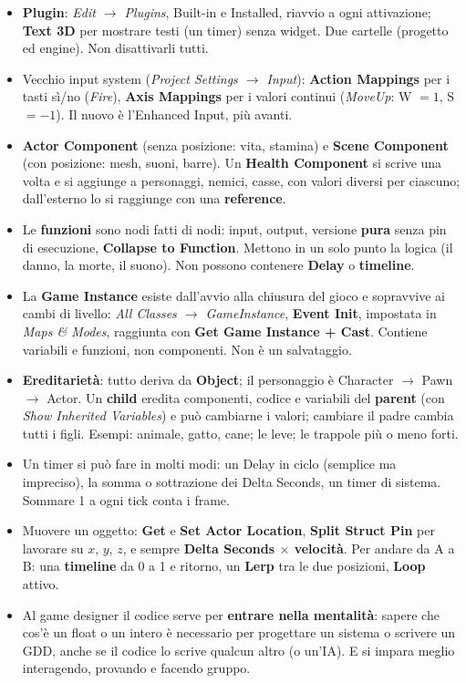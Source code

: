 \begin{itemize}
        versione vecchia. I branch sperimentali si possono abbandonare.
  \item \textbf{Plugin}: \emph{Edit $\rightarrow$ Plugins}, Built-in e
        Installed, riavvio a ogni attivazione; \textbf{Text 3D} per mostrare
        testi (un timer) senza widget. Due cartelle (progetto ed engine). Non
        disattivarli tutti.
  \item Vecchio input system (\emph{Project Settings $\rightarrow$ Input}):
        \textbf{Action Mappings} per i tasti sì/no (\emph{Fire}),
        \textbf{Axis Mappings} per i valori continui (\emph{MoveUp}: W $= 1$,
        S $= -1$). Il nuovo è l'Enhanced Input, più avanti.
  \item \textbf{Actor Component} (senza posizione: vita, stamina) e
        \textbf{Scene Component} (con posizione: mesh, suoni, barre). Un
        \textbf{Health Component} si scrive una volta e si aggiunge a
        personaggi, nemici, casse, con valori diversi per ciascuno; dall'esterno
        lo si raggiunge con una \textbf{reference}.
  \item Le \textbf{funzioni} sono nodi fatti di nodi: input, output, versione
        \textbf{pura} senza pin di esecuzione, \textbf{Collapse to Function}.
        Mettono in un solo punto la logica (il danno, la morte, il suono). Non
        possono contenere \textbf{Delay} o \textbf{timeline}.
  \item La \textbf{Game Instance} esiste dall'avvio alla chiusura del gioco e
        sopravvive ai cambi di livello: \emph{All Classes $\rightarrow$
        GameInstance}, \textbf{Event Init}, impostata in \emph{Maps \& Modes},
        raggiunta con \textbf{Get Game Instance + Cast}. Contiene variabili e
        funzioni, non componenti. Non è un salvataggio.
  \item \textbf{Ereditarietà}: tutto deriva da \textbf{Object}; il personaggio
        è Character $\rightarrow$ Pawn $\rightarrow$ Actor. Un \textbf{child}
        eredita componenti, codice e variabili del \textbf{parent} (con
        \emph{Show Inherited Variables}) e può cambiarne i valori; cambiare il
        padre cambia tutti i figli. Esempi: animale, gatto, cane; le leve; le
        trappole più o meno forti.
  \item Un timer si può fare in molti modi: un Delay in ciclo (semplice ma
        impreciso), la somma o sottrazione dei Delta Seconds, un timer di
        sistema. Sommare 1 a ogni tick conta i frame.
  \item Muovere un oggetto: \textbf{Get} e \textbf{Set Actor Location},
        \textbf{Split Struct Pin} per lavorare su $x$, $y$, $z$, e sempre
        \textbf{Delta Seconds $\times$ velocità}. Per andare da A a B: una
        \textbf{timeline} da 0 a 1 e ritorno, un \textbf{Lerp} tra le due
        posizioni, \textbf{Loop} attivo.
  \item Al game designer il codice serve per \textbf{entrare nella mentalità}:
        sapere che cos'è un float o un intero è necessario per progettare un
        sistema o scrivere un GDD, anche se il codice lo scrive qualcun altro (o
        un'IA). E si impara meglio interagendo, provando e facendo gruppo.
\end{itemize}
